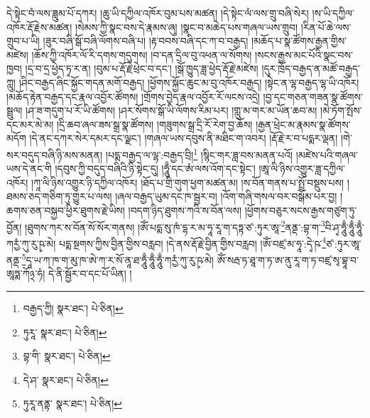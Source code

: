 དེ་སྟེང་བཾ་ལས་ཟླུམ་པོ་དཀར། །ཆུ་ཡི་དཀྱིལ་འཁོར་བུམ་པས་མཚན། །དེ་སྟེང་ལཾ་ལས་གྲུ་བཞི་སེར། །ས་ཡི་དཀྱིལ་འཁོར་རྡོ་རྗེས་མཚན། །སེམས་ཀྱི་སྣང་བས་དེ་རྣམས་ཞུ། །སྣང་བ་མཆེད་པས་གཞལ་ཡས་གྲུབ། །རིན་པོ་ཆེ་ལས་གྲུབ་པ་ཡི། །ཟུར་བཞི་སྒོ་བཞི་ལོགས་བཞི་པ། །རྟ་བབས་བཞི་དང་ཀ་བ་བརྒྱད། །མཆོད་པ་སྣ་ཚོགས་རྒྱན་གྱིས་མཛེས། །ཆོས་ཀྱི་འཁོར་ལོ་རི་དགས་གདུགས། །བ་དན་དྲིལ་བུ་འཕན་ལ་སོགས། །སངས་རྒྱས་མང་པོའི་སྣང་བས་ཁྱབ། །དྲ་བ་དྲ་ཕྱེད་ཏྭ་ར་ན། །བུམ་པ་རྡོ་རྗེ་ཕྲེང་བ་དང་། །སྒོ་ཁྱུད་ཟླ་ཕྱེད་རྡོ་རྗེ་མཛེས། །དུར་ཁྲོད་བརྒྱད་ན་མཚོ་བརྒྱད་ཀླུ། །ཤིང་བརྒྱད་ཞིང་སྐྱོང་གདན་མགོ་བརྒྱད། །ཕྱོགས་སྐྱོང་ཆུང་མ་བུ་འཁོར་བརྒྱད། །སྟེང་ན་ལྷ་བརྒྱད་ལྷ་ཡི་འཁོར། །མཆོད་རྟེན་བརྒྱད་དང་རྣལ་འབྱོར་ཚོགས། །གྲོགས་བྱེད་རྣལ་འབྱོར་རོ་ལངས་འདྲེ། །བྱ་དང་གཅན་གཟན་སྣ་ཚོགས་སྦྲུལ། །ཤ་ཟ་གདུག་པ་རོ་ཡི་ཚོགས། །ཤར་སོགས་སྒོ་ཡི་ལོགས་རིམ་པར། །གླུ་མ་གར་མ་ཡོན་ཆབ་མ། །མེ་ཏོག་སྤོས་དང་མར་མེ་མ། །དྲི་ཆབ་ཞལ་ཟས་སྒྲ་སྣ་ཚོགས། །གཟུགས་སྒྲ་དྲི་རོ་རེག་བྱ་ཆོས། །རྒྱན་ཕྲེང་མ་རྣམས་སྣ་ཚོགས་མདོག །དེ་ནང་དཀར་སེར་དམར་དང་ལྗང་། །གཞལ་ཡས་དབུས་ནི་མཐིང་ག་འབར། །རྡོ་རྗེ་ར་བ་པདྨར་ལྡན། །གེ་སར་བདུད་བཞི་ཉི་མས་མནན། །པདྨ་བརྒྱད་ལ་ལྷ་:བརྒྱད་བྲི།\footnote{བརྒྱད་ཀྱི།  སྣར་ཐང་།  པེ་ཅིན། } །སྙིང་གར་ཟླ་བས་མནན་པའོ། །མཛེས་པའི་གཞལ་ཡས་དེ་ནང་གི །དབུས་ཀྱི་བདུད་བཞིའི་ཉི་སྟེང་དུ། །ཧཱུྃ་དང་ཨཾ་ལས་འོག་དང་སྟེང་། །ཨཱ་ལི་ཉིས་འགྱུར་ཟླ་དཀྱིལ་འཁོར། །ཀཱ་ལི་ཉིས་འགྱུར་ཉི་དཀྱིལ་འཁོར། །ཐོད་པ་གྲི་གུག་ཕྱག་མཚན་མ། །ས་བོན་གནས་པ་སྤྲོ་བསྡུས་པས། །ཐམས་ཅད་གཅིག་ཏུ་གྱུར་པ་ལས། །ཞལ་བརྒྱད་ཡུམ་དང་ཁ་སྦྱར་བ། །འོག་གཞི་གསལ་བར་བསྒོམ་པར་བྱ། །ཆགས་ཅན་བསྐྱབ་ཕྱིར་ཐུགས་རྗེ་ཡིས། །བདག་ཉིད་ཐུགས་ཀའི་ས་བོན་ལས། །ཕྱོགས་བཅུར་སངས་རྒྱས་གཙུག་ཏུ་བྱོན། །ཐུགས་ཀར་ས་བོན་སོ་སོར་གནས། །ཨོཾ་པདྨ་སུ་ཁཾ་དྷ་ར་མ་ཧཱ་རཱ་ག་དཏྟ་ཙ་:ཏུར་ཨཱ་\footnote{ཏུརཱ་  སྣར་ཐང་།  པེ་ཅིན། }ནནྡ་:བྷ་ག་\footnote{བྷ་གི་  སྣར་ཐང་།  པེ་ཅིན། }བི་ཤྭ་ཧཱུྃ་ཧཱུྃ་ཧཱུྃ་ཀརྱཾ་ཀུ་རུ་ཥྭ་མེ། པདྨ་སྔགས་ཀྱིས་བྱིན་གྱིས་བརླབ། །དེ་ནས་རྡོ་རྗེ་བྱིན་གྱིས་བརླབ། །ཨོཾ་བཛྲ་མ་ཧཱ་:དྭེ་ཥ་\footnote{དེ་ཤ་  སྣར་ཐང་།  པེ་ཅིན། }ཙ་:ཏུར་ཨཱ་ནནྡ་\footnote{ཏུརཱ་ནནྟ་  སྣར་ཐང་།  པེ་ཅིན། }དཱ་ཡ་ཀ་ཁ་ག་མུ་ཁ་ཨེ་ཀ་ར་སོ་ནཱ་ཐ་ཧཱུྃ་ཧཱུྃ་ཧཱུྃ་ཀརྱཾ་ཀུ་རུ་ཥྭ་མེ། ཨོཾ་སརྦ་ཏ་ཐཱ་ག་ཏ་ཨ་ནུ་རཱ་ག་ཏ་བཛྲ་སྭ་བྷཱ་བ་ཨཱཏྨ་ཀོ྅་ཧཾ། དེ་ནི་སྦྱོར་བ་དང་པོ་ཡིན། །

